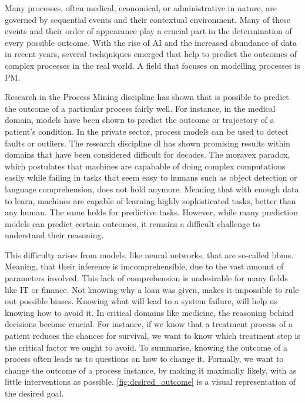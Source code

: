 \documentclass[./../../paper.tex]{subfiles}
\begin{document}
Many processes, often medical, economical, or administrative in nature, are governed by sequential events and their contextual environment. Many of these events and their order of appearance play a crucial part in the determination of every possible outcome\needscite{}. With the rise of AI and the increased abundance of data in recent years, several techqniques emerged that help to predict the outcomes of complex processes in the real world. A field that focuses on modelling processes is \gls{PM}.

Research in the Process Mining discipline has shown that is possible to predict the outcome of a particular process fairly well\needscite{}. 
For instance, in the medical domain, models have been shown to predict the outcome or trajectory of a patient's condition\needscite{}. In the private sector, process models can be used to detect faults or outliers. The research discipline \gls{dl} has shown promising results within domains that have been considered difficult for decades. The moravex paradox, which postulates that machines are capabable of doing complex computations easily while failing in tasks that seem easy to humans such as object detection or language comprehension, does not hold anymore. Meaning that with enough data to learn, machines are capable of learning highly sophisticated tasks, better than any human. The same holds for predictive tasks. However, while many prediction models can predict certain outcomes, it remains a difficult challenge to understand their reasoning. 

This difficulty arises from models, like neural networks, that are so-called \glspl{bbm}. Meaning, that their inference is imcomprehensible, due to the vast amount of parameters involved. This lack of comprehension is undesirable for many fields like IT or finance. Not knowing why a loan was given, makes it impossible to rule out possible biases. Knowing what will lead to a system failure, will help us knowing how to avoid it. In critical domains like medicine, the reasoning behind decisions become crucial. For instance, if we know that a treatment process of a patient reduces the chances for survival, we want to know which treatment step is the critical factor we ought to avoid. To summarise, knowing the outcome of a process often leads us to questions on how to change it. Formally, we want to change the outcome of a process instance, by making it maximally likely, with as little interventions as possible\needscite{}. \autoref{fig:desired_outcome} is a visual representation of the desired goal.
\end{document}
